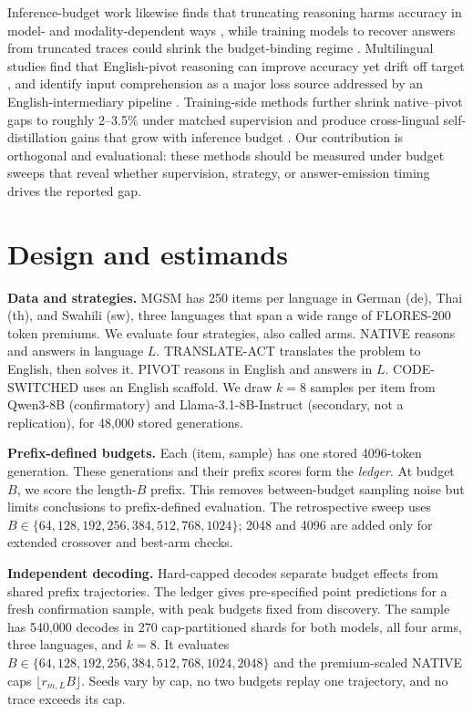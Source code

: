 \documentclass[11pt]{article}
\begin{document}
Inference-budget work likewise finds that truncating reasoning harms accuracy in model- and modality-dependent ways \citep{brokenchains}, while training models to recover answers from truncated traces could shrink the budget-binding regime \citep{trsd}. Multilingual studies find that English-pivot reasoning can improve accuracy yet drift off target \citep{mmath}, and identify input comprehension as a major loss source addressed by an English-intermediary pipeline \citep{ust}. Training-side methods further shrink native--pivot gaps to roughly 2--3.5\% under matched supervision \citep{layerswap} and produce cross-lingual self-distillation gains that grow with inference budget \citep{copsd}. Our contribution is orthogonal and evaluational: these methods should be measured under budget sweeps that reveal whether supervision, strategy, or answer-emission timing drives the reported gap.

\section{Design and estimands}
\label{sec:design}

\textbf{Data and strategies.} MGSM has 250 items per language in German (de), Thai (th), and Swahili (sw), three languages that span a wide range of FLORES-200 token premiums. We evaluate four strategies, also called arms. NATIVE reasons and answers in language \(L\). TRANSLATE-ACT translates the problem to English, then solves it. PIVOT reasons in English and answers in \(L\). CODE-SWITCHED uses an English scaffold. We draw \(k=8\) samples per item from Qwen3-8B \citep{qwen3} (confirmatory) and Llama-3.1-8B-Instruct \citep{llama3} (secondary, not a replication), for 48,000 stored generations.

\textbf{Prefix-defined budgets.} Each (item, sample) has one stored 4096-token generation. These generations and their prefix scores form the \emph{ledger}. At budget \(B\), we score the length-\(B\) prefix. This removes between-budget sampling noise but limits conclusions to prefix-defined evaluation. The retrospective sweep uses \(B \in \{64,128,192,256,384,512,768,1024\}\); 2048 and 4096 are added only for extended crossover and best-arm checks.

\textbf{Independent decoding.} Hard-capped decodes separate budget effects from shared prefix trajectories. The ledger gives pre-specified point predictions for a fresh confirmation sample, with peak budgets fixed from discovery. The sample has 540,000 decodes in 270 cap-partitioned shards for both models, all four arms, three languages, and \(k=8\). It evaluates \(B \in \{64,128,192,256,384,512,768,1024,2048\}\) and the premium-scaled NATIVE caps \(\lfloor r_{m,L}B\rfloor\). Seeds vary by cap, no two budgets replay one trajectory, and no trace exceeds its cap.
\end{document}
